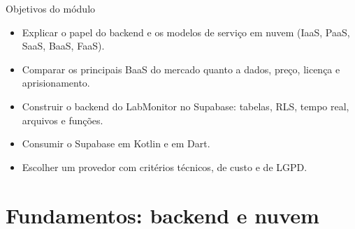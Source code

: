 \documentclass[aspectratio=169,10pt]{beamer}
\begin{document}
\capa

\begin{frame}{Objetivos do módulo}
  \begin{conceito}
    \begin{itemize}
      \item Explicar o papel do backend e os modelos de serviço em nuvem (IaaS, PaaS, SaaS, BaaS, FaaS).
      \item Comparar os principais BaaS do mercado quanto a dados, preço, licença e aprisionamento.
      \item Construir o backend do LabMonitor no Supabase: tabelas, RLS, tempo real, arquivos e funções.
      \item Consumir o Supabase em Kotlin e em Dart.
      \item Escolher um provedor com critérios técnicos, de custo e de LGPD.
    \end{itemize}
  \end{conceito}
\end{frame}

\sumario

\section{Fundamentos: backend e nuvem}
\end{document}
